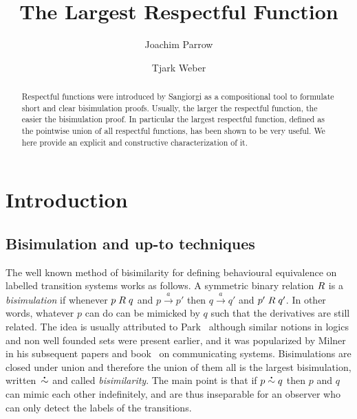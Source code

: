 \documentclass{CSML}
\theoremstyle{definition}
\newcommand{\act}{a}
\newcommand{\trans}[2]{{#1} \stackrel{\act}{\longrightarrow} {#2}}
\newcommand{\bisim}{\stackrel{\mbox{\bf .}}{\sim}}
\begin{document}
\title[The Largest Respectful Function]{The Largest Respectful Function}
\author[J.~Parrow]{Joachim Parrow}
\author[T.~Weber]{Tjark Weber}
\address{Uppsala University, Sweden}

\begin{abstract}
  Respectful functions were introduced by Sangiorgi as a compositional
  tool to formulate short and clear bisimulation proofs.  Usually, the larger the respectful function, the easier the bisimulation proof.
  In particular the largest respectful function, defined as the
  pointwise union of all respectful functions, has been shown to be very useful.  We here
  provide an explicit and constructive characterization of it.
\end{abstract}

\maketitle

\section{Introduction}

\subsection{Bisimulation and up-to techniques}

The well known method of bisimilarity for defining behavioural
equivalence on labelled transition systems works as follows. A
symmetric binary relation $\mathrel{R}$ is a {\em bisimulation} if whenever $p
\mathrel{R} q$ and $\trans{p}{p'}$ then $\trans{q}{q'}$ and $p'\mathrel{R} q'$.  In
other words, whatever $p$ can do can be mimicked by $q$ such that the
derivatives are still related.  The idea is usually attributed to
Park~\cite{Park1981} although similar notions in logics and non well
founded sets were present earlier, and it was popularized by Milner in
his subsequent papers and book~\cite{Milner1989} on communicating
systems.  Bisimulations are closed under union and therefore the union
of them all is the largest bisimulation, written~$\bisim$ and called
{\em bisimilarity}. The main point is that if $p \bisim q$ then $p$
and $q$ can mimic each other indefinitely, and are thus inseparable
for an observer who can only detect the labels of the transitions.
\end{document}

